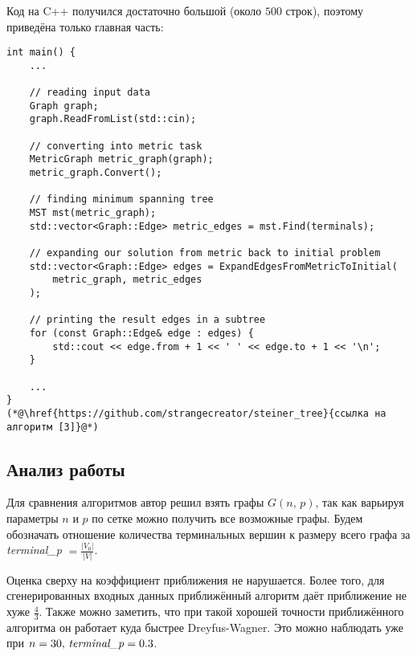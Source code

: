 \documentclass[a4paper,12pt]{article}
\begin{document}
    \vspace{1em}

    \noindent Код на C++ получился достаточно большой (около $500$ строк), поэтому приведёна только главная часть:

    \vspace{1em}

    \begin{lstlisting}
int main() {
    ...

    // reading input data
    Graph graph;
    graph.ReadFromList(std::cin);

    // converting into metric task
    MetricGraph metric_graph(graph);
    metric_graph.Convert();

    // finding minimum spanning tree
    MST mst(metric_graph);
    std::vector<Graph::Edge> metric_edges = mst.Find(terminals);

    // expanding our solution from metric back to initial problem
    std::vector<Graph::Edge> edges = ExpandEdgesFromMetricToInitial(
        metric_graph, metric_edges
    );

    // printing the result edges in a subtree
    for (const Graph::Edge& edge : edges) {
        std::cout << edge.from + 1 << ' ' << edge.to + 1 << '\n';
    }
    
    ...
}
(*@\href{https://github.com/strangecreator/steiner_tree}{ссылка на алгоритм [3]}@*)
    \end{lstlisting}
    
    \subsection{Анализ работы}

    \noindent Для сравнения алгоритмов автор решил взять графы $G(n, \, p)$, так как варьируя параметры $n$ и $p$ по сетке можно получить все возможные графы. Будем обозначать отношение количества терминальных вершин к размеру всего графа за \textit{terminal\_p} $ = \frac{|V_0|}{|V|}$.

    \vspace{1em}

    \noindent Оценка сверху на коэффициент приближения не нарушается. Более того, для сгенерированных входных данных приближённый алгоритм даёт приближение не хуже $\frac{4}{3}$. Также можно заметить, что при такой хорошей точности приближённого алгоритма он работает куда быстрее Dreyfus-Wagner. Это можно наблюдать уже при $n=30, \, \text{\textit{terminal\_p}} = 0.3$.
\end{document}
